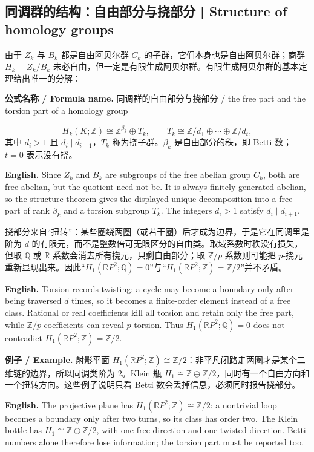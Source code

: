\documentclass[UTF8,11pt,a4paper]{ctexart}
\newcommand{\EN}[1]{\par\noindent\textbf{English.} #1\par}
\newcommand{\FORMULA}[2]{\par\noindent\textbf{公式名称 / Formula name.} #1 / #2\par}
\newcommand{\EX}[2]{\par\noindent\textbf{例子 / Example.} #1\par\EN{#2}}
\begin{document}
\subsection{同调群的结构：自由部分与挠部分 | Structure of homology groups}
\noindent 由于 $Z_k$ 与 $B_k$ 都是自由阿贝尔群 $C_k$ 的子群，它们本身也是自由阿贝尔群；商群 $H_k=Z_k/B_k$ 未必自由，但一定是有限生成阿贝尔群。有限生成阿贝尔群的基本定理给出唯一的分解：
\FORMULA{同调群的自由部分与挠部分}{the free part and the torsion part of a homology group}
\[
H_k(K;\mathbb Z)\cong \mathbb Z^{\beta_k}\oplus T_k,
\qquad
T_k\cong\mathbb Z/d_1\oplus\cdots\oplus\mathbb Z/d_t,
\]
其中 $d_i>1$ 且 $d_i\mid d_{i+1}$，$T_k$ 称为挠子群。$\beta_k$ 是自由部分的秩，即 Betti 数；$t=0$ 表示没有挠。
\EN{Since $Z_k$ and $B_k$ are subgroups of the free abelian group $C_k$, both are free abelian, but the quotient need not be. It is always finitely generated abelian, so the structure theorem gives the displayed unique decomposition into a free part of rank $\beta_k$ and a torsion subgroup $T_k$. The integers $d_i>1$ satisfy $d_i\mid d_{i+1}$.}

\noindent 挠部分来自“扭转”：某些圈绕两圈（或若干圈）后才成为边界，于是它在同调里是阶为 $d$ 的有限元，而不是整数倍可无限区分的自由类。取域系数时秩没有损失，但取 $\mathbb Q$ 或 $\mathbb R$ 系数会消去所有挠元，只剩自由部分；取 $\mathbb Z/p$ 系数则可能把 $p$-挠元重新显现出来。因此“$H_1(\mathbb R P^2;\mathbb Q)=0$”与“$H_1(\mathbb R P^2;\mathbb Z)=\mathbb Z/2$”并不矛盾。
\EN{Torsion records twisting: a cycle may become a boundary only after being traversed $d$ times, so it becomes a finite-order element instead of a free class. Rational or real coefficients kill all torsion and retain only the free part, while $\mathbb Z/p$ coefficients can reveal $p$-torsion. Thus $H_1(\mathbb R P^2;\mathbb Q)=0$ does not contradict $H_1(\mathbb R P^2;\mathbb Z)=\mathbb Z/2$.}

\EX{射影平面 $H_1(\mathbb R P^2;\mathbb Z)\cong\mathbb Z/2$：非平凡闭路走两圈才是某个二维链的边界，所以同调类阶为 $2$。Klein 瓶 $H_1\cong\mathbb Z\oplus\mathbb Z/2$，同时有一个自由方向和一个扭转方向。这些例子说明只看 Betti 数会丢掉信息，必须同时报告挠部分。}{The projective plane has $H_1(\mathbb R P^2;\mathbb Z)\cong\mathbb Z/2$: a nontrivial loop becomes a boundary only after two turns, so its class has order two. The Klein bottle has $H_1\cong\mathbb Z\oplus\mathbb Z/2$, with one free direction and one twisted direction. Betti numbers alone therefore lose information; the torsion part must be reported too.}
\end{document}
